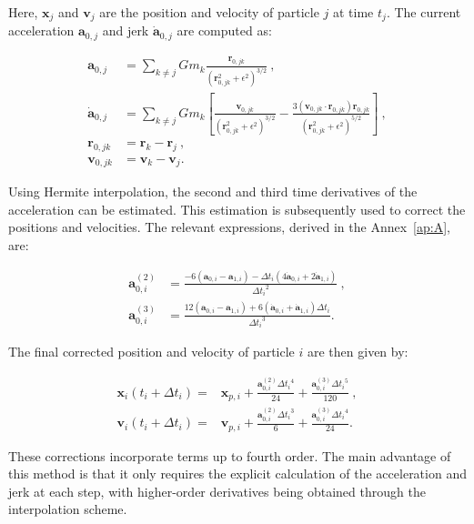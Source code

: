 Here, $\mathbf{x}_j$ and $\mathbf{v}_j$ are the position and velocity of particle $j$ at time $t_j$. The current acceleration $\mathbf{a}_{0,j}$ and jerk $\dot{\mathbf{a}}_{0,j}$ are computed as:

 
\begin{align}
	\mathbf{a}_{0, j} &= \sum_{k \neq j} G m_k \frac{\mathbf{r}_{0,jk}}{(\mathbf{r}_{0,jk}^2 + \epsilon^2)^{3/2}}~,\\
	\dot{\mathbf{a}}_{0, j} &= \sum_{k \neq j} G m_k \left[\frac{\mathbf{v}_{0,jk}}{(\mathbf{r}_{0,jk}^2 + \epsilon^2)^{3/2}} - \frac{3(\mathbf{v}_{0,jk} \cdot \mathbf{r}_{0,jk})\mathbf{r}_{0,jk}}{(\mathbf{r}_{0,jk}^2 + \epsilon^2)^{5/2}}\right] ~,\\
	\mathbf{r}_{0,jk} &= \mathbf{r}_{k} - \mathbf{r}_{j} ~,\\
	\mathbf{v}_{0,jk} &= \mathbf{v}_{k} - \mathbf{v}_{j}.
\end{align}

Using Hermite interpolation, the second and third time derivatives of the acceleration can be estimated. This estimation is subsequently used to correct the positions and velocities. The relevant expressions, derived in the Annex~\ref{ap:A}, are:

\begin{align}
	\mathbf{a}^{(2)}_{0, i} &= \frac{-6(\mathbf{a}_{0, i} - \mathbf{a}_{1, i}) - \Delta t_i(4\dot{\mathbf{a}}_{0, i} + 2\dot{\mathbf{a}}_{1, i})}{{\Delta t_i}^2} ~, \\
	\mathbf{a}^{(3)}_{0, i} &= \frac{12 (\mathbf{a}_{0, i} - \mathbf{a}_{1, i}) + 6(\dot{\mathbf{a}}_{0, i} + \dot{\mathbf{a}}_{1, i})\Delta t_i}{{\Delta t_i}^3}.
\end{align}

The final corrected position and velocity of particle $i$ are then given by:

\begin{align}
	\mathbf{x}_i(t_i + \Delta t_i) =& \mathbf{x}_{p, i} + \frac{\mathbf{a}^{(2)}_{0, i} {\Delta t_i}^4}{24} + \frac{\mathbf{a}^{(3)}_{0, i} {\Delta t_i}^5}{120} ~, \\
	\mathbf{v}_i(t_i + \Delta t_i) =& \mathbf{v}_{p, i} + \frac{\mathbf{a}^{(2)}_{0, i} {\Delta t_i}^3}{6} + \frac{\mathbf{a}^{(3)}_{0, i} {\Delta t_i}^4}{24}.
\end{align}

These corrections incorporate terms up to fourth order. The main advantage of this method is that it only requires the explicit calculation of the acceleration and jerk at each step, with higher-order derivatives being obtained through the interpolation scheme.


